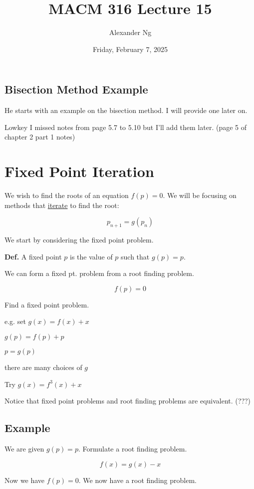 \documentclass[12pt]{article}
\newcommand{\defn}{\textbf{Def.}\xspace}
\begin{document}
\title{MACM 316 Lecture 15}
\author{Alexander Ng}
\date{Friday, February 7, 2025}

\maketitle

\subsection*{Bisection Method Example}

He starts with an example on the bisection method. I will provide one later on.

Lowkey I missed notes from page 5.7 to 5.10 but I'll add them later. (page 5 of
chapter 2 part 1 notes)

\section{Fixed Point Iteration}

We wish to find the roots of an equation $f(p) = 0$. We will be focusing on
methods that \uline{iterate} to find the root:

\[ p_{n+1} = g(p_n) \]

We start by considering the fixed point problem.

\defn A fixed point $p$ is the value of $p$ such that $g(p) = p$.

We can form a fixed pt. problem from a root finding problem.

\[ f(p) = 0 \]

Find a fixed point problem.

e.g. set $g(x) = f(x) + x$

$g(p) = f(p) + p$

$p = g(p)$

there are many choices of $g$

Try $g(x) = f^3(x) + x$

Notice that fixed point problems and root finding problems are equivalent. (???)

\subsection{Example}

We are given $g(p) = p$. Formulate a root finding problem.

\[ f(x) = g(x) - x \]

Now we have $f(p) = 0$. We now have a root finding problem.
\end{document}

